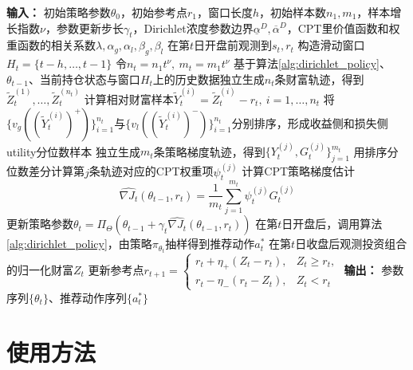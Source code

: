 \documentclass{sufethesismas}
\begin{document}
\begin{algorithm}[H]
\caption{基于动态参考点的CPT-PG在线优化器}
\label{alg:drcpt_pg}
\begin{algorithmic}[1]
\STATE \textbf{输入：} 初始策略参数$\theta_0$，初始参考点$r_1$，窗口长度$h$，初始样本数$n_1,m_1$，样本增长指数$\nu$，参数更新步长$\gamma_t$，Dirichlet浓度参数边界$\underline{\alpha}^D,\overline{\alpha}^D$，CPT里价值函数和权重函数的相关系数$\lambda,\alpha_g,\alpha_l,\beta_g,\beta_l$
    \STATE 在第$t$日开盘前观测到$s_t,r_t$
    \STATE 构造滑动窗口$H_t=\{t-h,\dots,t-1\}$
    \STATE 令$n_t=n_1 t^{\nu},\ m_t=m_1 t^{\nu}$
    \STATE 基于算法\ref{alg:dirichlet_policy}、$\theta_{t-1}$、当前持仓状态与窗口$H_t$上的历史数据独立生成$n_t$条财富轨迹，得到$\widetilde{Z}_t^{(1)},\dots,\widetilde{Z}_t^{(n_t)}$
    \STATE 计算相对财富样本$\widetilde{Y}_t^{(i)}=\widetilde{Z}_t^{(i)}-r_t,\ i=1,\dots,n_t$
    \STATE 将$\{v_g((\widetilde{Y}_t^{(i)})^+)\}_{i=1}^{n_t}$与$\{v_l((\widetilde{Y}_t^{(i)})^-)\}_{i=1}^{n_t}$分别排序，形成收益侧和损失侧utility分位数样本
    \STATE 独立生成$m_t$条策略梯度轨迹，得到$\{Y_t^{(j)},G_t^{(j)}\}_{j=1}^{m_t}$
        \STATE 用排序分位数差分计算第$j$条轨迹对应的CPT权重项$\psi_t^{(j)}$
    \ENDFOR
    \STATE 计算CPT策略梯度估计
    \begin{equation*}
    \widehat{\nabla J_t}(\theta_{t-1},r_t)
    =
    \frac{1}{m_t}
    \sum_{j=1}^{m_t}
    \psi_t^{(j)}
    G_t^{(j)}
    \end{equation*}
    \STATE 更新策略参数$
    \theta_t
    =
    \Pi_{\Theta}
    \left(
    \theta_{t-1}
    +
    \gamma_t
    \widehat{\nabla J_t}(\theta_{t-1},r_t)
    \right)
    $
    \STATE 在第$t$日开盘后，调用算法\ref{alg:dirichlet_policy}，由策略$\pi_{\theta_t}$抽样得到推荐动作$a_t^*$
    \STATE 在第$t$日收盘后观测投资组合的归一化财富$Z_t$
    \STATE 更新参考点$
    r_{t+1}
    =
    \begin{cases}
    r_t+\eta_+\left(Z_t-r_t\right), & Z_t\ge r_t,\\[4pt]
    r_t-\eta_-\left(r_t-Z_t\right), & Z_t<r_t
    \end{cases}
    $
\ENDFOR
\STATE \textbf{输出：} 参数序列$\{\theta_t\}$、推荐动作序列$\{a_t^*\}$
\end{algorithmic}
\end{algorithm}

\chapter{使用方法}
\end{document}
